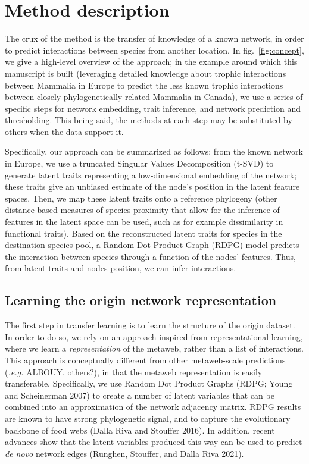 \documentclass[10pt,oneside]{article}
\begin{document}
\hypertarget{method-description}{%
\section{Method description}\label{method-description}}

The crux of the method is the transfer of knowledge of a known network,
in order to predict interactions between species from another location.
In fig.~\ref{fig:concept}, we give a high-level overview of the
approach; in the example around which this manuscript is built
(leveraging detailed knowledge about trophic interactions between
Mammalia in Europe to predict the less known trophic interactions
between closely phylogenetically related Mammalia in Canada), we use a
series of specific steps for network embedding, trait inference, and
network prediction and thresholding. This being said, the methods at
each step may be substituted by others when the data support it.

Specifically, our approach can be summarized as follows: from the known
network in Europe, we use a truncated Singular Values Decomposition
(t-SVD) to generate latent traits representing a low-dimensional
embedding of the network; these traits give an unbiased estimate of the
node's position in the latent feature spaces. Then, we map these latent
traits onto a reference phylogeny (other distance-based measures of
species proximity that allow for the inference of features in the latent
space can be used, such as for example dissimilarity in functional
traits). Based on the reconstructed latent traits for species in the
destination species pool, a Random Dot Product Graph (RDPG) model
predicts the interaction between species through a function of the
nodes' features. Thus, from latent traits and nodes position, we can
infer interactions.

\hypertarget{learning-the-origin-network-representation}{%
\subsection{Learning the origin network
representation}\label{learning-the-origin-network-representation}}

The first step in transfer learning is to learn the structure of the
origin dataset. In order to do so, we rely on an approach inspired from
representational learning, where we learn a \emph{representation} of the
metaweb, rather than a list of interactions. This approach is
conceptually different from other metaweb-scale predictions
(\emph{.e.g.} ALBOUY, others?), in that the metaweb representation is
easily transferable. Specifically, we use Random Dot Product Graphs
(RDPG; Young and Scheinerman 2007) to create a number of latent
variables that can be combined into an approximation of the network
adjacency matrix. RDPG results are known to have strong phylogenetic
signal, and to capture the evolutionary backbone of food webs (Dalla
Riva and Stouffer 2016). In addition, recent advances show that the
latent variables produced this way can be used to predict \emph{de novo}
network edges (Runghen, Stouffer, and Dalla Riva 2021).
\end{document}

